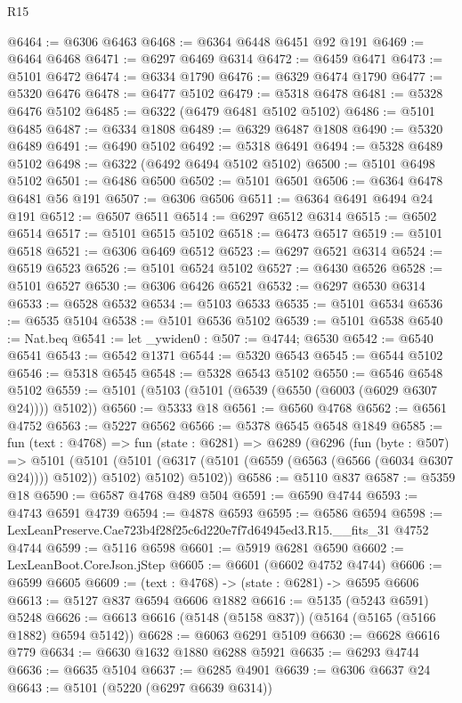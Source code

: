 \begin{lexlean}{R15}
\begin{coremodule}
{{{{{{{{{{{@6464 := @6306 @6463
@6468 := @6364 @6448 @6451 @92 @191
@6469 := @6464 @6468
@6471 := @6297 @6469 @6314
@6472 := @6459 @6471
@6473 := @5101 @6472
@6474 := @6334 @1790
@6476 := @6329 @6474 @1790
@6477 := @5320 @6476
@6478 := @6477 @5102
@6479 := @5318 @6478
@6481 := @5328 @6476 @5102
@6485 := @6322 (@6479 @6481 @5102 @5102)
@6486 := @5101 @6485
@6487 := @6334 @1808
@6489 := @6329 @6487 @1808
@6490 := @5320 @6489
@6491 := @6490 @5102
@6492 := @5318 @6491
@6494 := @5328 @6489 @5102
@6498 := @6322 (@6492 @6494 @5102 @5102)
@6500 := @5101 @6498 @5102
@6501 := @6486 @6500
@6502 := @5101 @6501
@6506 := @6364 @6478 @6481 @56 @191
@6507 := @6306 @6506
@6511 := @6364 @6491 @6494 @24 @191
@6512 := @6507 @6511
@6514 := @6297 @6512 @6314
@6515 := @6502 @6514
@6517 := @5101 @6515 @5102
@6518 := @6473 @6517
@6519 := @5101 @6518
@6521 := @6306 @6469 @6512
@6523 := @6297 @6521 @6314
@6524 := @6519 @6523
@6526 := @5101 @6524 @5102
@6527 := @6430 @6526
@6528 := @5101 @6527
@6530 := @6306 @6426 @6521
@6532 := @6297 @6530 @6314
@6533 := @6528 @6532
@6534 := @5103 @6533
@6535 := @5101 @6534
@6536 := @6535 @5104
@6538 := @5101 @6536 @5102
@6539 := @5101 @6538
@6540 := Nat.beq
@6541 := let _ywiden0 : @507 := @4744; @6530
@6542 := @6540 @6541
@6543 := @6542 @1371
@6544 := @5320 @6543
@6545 := @6544 @5102
@6546 := @5318 @6545
@6548 := @5328 @6543 @5102
@6550 := @6546 @6548 @5102
@6559 := @5101 (@5103 (@5101 (@6539 (@6550 (@6003 (@6029 @6307 @24)))) @5102))
@6560 := @5333 @18
@6561 := @6560 @4768
@6562 := @6561 @4752
@6563 := @5227 @6562
@6566 := @5378 @6545 @6548 @1849
@6585 := fun (text : @4768) =>
  fun (state : @6281) =>
  @6289
    (@6296
      (fun (byte : @507) =>
      @5101
        (@5101 (@5101 (@6317 (@5101 (@6559 (@6563 (@6566 (@6034 @6307 @24)))) @5102)) @5102) @5102)
        @5102))
@6586 := @5110 @837
@6587 := @5359 @18
@6590 := @6587 @4768 @489 @504
@6591 := @6590 @4744
@6593 := @4743 @6591 @4739
@6594 := @4878 @6593
@6595 := @6586 @6594
@6598 := LexLeanPreserve.Cae723b4f28f25c6d220e7f7d64945ed3.R15.__fits_31 @4752 @4744
@6599 := @5116 @6598
@6601 := @5919 @6281 @6590
@6602 := LexLeanBoot.CoreJson.jStep
@6605 := @6601 (@6602 @4752 @4744)
@6606 := @6599 @6605
@6609 := (text : @4768) -> (state : @6281) -> @6595 @6606
@6613 := @5127 @837 @6594 @6606 @1882
@6616 := @5135 (@5243 @6591) @5248
@6626 := @6613 @6616 (@5148 (@5158 @837)) (@5164 (@5165 (@5166 @1882) @6594 @5142))
@6628 := @6063 @6291 @5109
@6630 := @6628 @6616 @779
@6634 := @6630 @1632 @1880 @6288 @5921
@6635 := @6293 @4744
@6636 := @6635 @5104
@6637 := @6285 @4901
@6639 := @6306 @6637 @24
@6643 := @5101 (@5220 (@6297 @6639 @6314))
}}}}}}}}}}}
\end{coremodule}
\end{lexlean}
